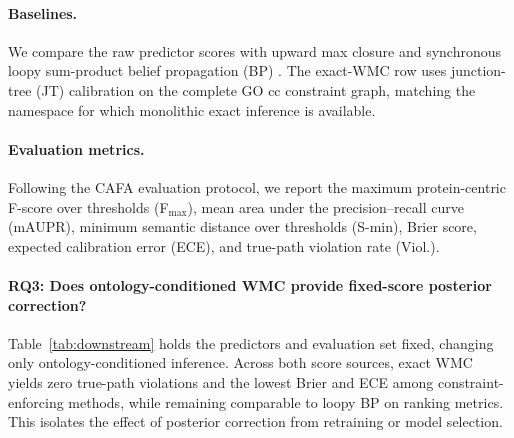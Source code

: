 \documentclass[letterpaper]{article}
\begin{document}
\paragraph{Baselines.}
We compare the raw predictor scores with upward max closure
\citep{obozinski2008consistent,giunchiglia2020chmcnn}
and synchronous loopy sum-product belief propagation (BP)
\citep{pearl1988probabilistic}. The exact-WMC row uses junction-tree
(JT) calibration on the complete GO cc constraint graph, matching the
namespace for which monolithic exact inference is available.

\paragraph{Evaluation metrics.}
Following the CAFA evaluation protocol, we report the maximum
protein-centric F-score over thresholds (F$_{\max}$), mean area under
the precision--recall curve (mAUPR), minimum semantic distance over
thresholds (S-min), Brier score, expected calibration error (ECE),
and true-path violation rate (Viol.).

\paragraph{RQ3: Does ontology-conditioned WMC provide
fixed-score posterior correction?}
Table~\ref{tab:downstream} holds the predictors and evaluation set
fixed, changing only ontology-conditioned inference. Across both
score sources, exact WMC yields zero true-path violations and the lowest
Brier and ECE among constraint-enforcing methods, while remaining
comparable to loopy BP on ranking metrics. This isolates the effect of
posterior correction from retraining or model selection.
\end{document}
